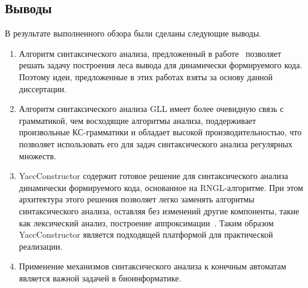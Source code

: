 \subsection{Выводы}
В результате выполненного обзора были сделаны следующие выводы.
\begin{enumerate}
\item Алгоритм синтаксического анализа, предложенный в работе~\cite{RelaxedARNGLR} позволяет решать задачу построения леса вывода для динамически формируемого кода. Поэтому идеи, предложенные в этих работах взяты за основу данной диссертации.
\item Алгоритм синтаксического анализа GLL имеет более очевидную связь с грамматикой, чем восходящие алгоритмы анализа, поддерживает произвольные КС-грамматики и обладает высокой производительностью, что позволяет использовать его для задач синтаксического анализа регулярных множеств.
\item YaccConstructor содержит готовое решение для синтаксического анализа динамически формируемого кода, основанное на RNGL-алгоритме. При этом архитектура этого решения позволяет легко заменять алгоритмы синтаксического анализа, оставляя без изменений другие компоненты, такие как лексический анализ, построение аппроксимации~\cite{SELforIDE}. Таким образом YaccConstructor является подходящей платформой для практической реализации.
\item Применение механизмов синтаксического анализа к конечным автоматам является важной задачей в биоинформатике.
\end{enumerate}
